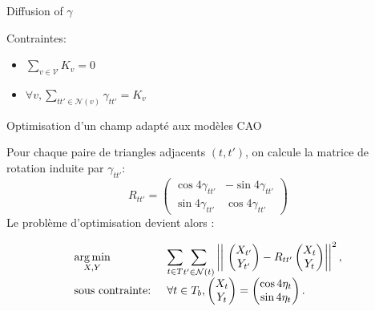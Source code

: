 \begin{frame}{Diffusion of $\gamma$}
\begin{minipage}{0.39\textwidth}
        \vspace{1em}
        \begin{block}{Contraintes:}
            \begin{itemize}
                \item \(\displaystyle\sum_{v \in \mathcal{V}} K_v =0\) 
                \item $ \forall v,\displaystyle\sum_{tt' \in \mathcal{N}(v)}\gamma_{tt'} = K_v$
            \end{itemize}
        \end{block}
    \end{minipage}
    
\end{frame}

\begin{frame}{Optimisation d'un champ adapté aux modèles CAO}

    Pour chaque paire de triangles adjacents $(t, t')$, on calcule la matrice de rotation 
    induite par $\gamma_{tt'}$:
    $$R_{tt'} = \begin{pmatrix}\cos4\gamma_{tt'} & -\sin4\gamma_{tt'} \\ \sin4\gamma_{tt'} & \cos4\gamma_{tt'} \end{pmatrix}$$
    Le problème d'optimisation devient alors :
   
    \begin{equation*}
        \begin{array}{ll}
        \underset{X, Y}{\operatorname*{arg\,min}} & \underset{t \in T}{\displaystyle\sum} \underset{t' \in \mathcal{N}(t)}{\displaystyle\sum} \left|\left|\ \begin{pmatrix} X_{t'}\\ Y_{t'}\end{pmatrix} - R_{tt'} \begin{pmatrix} X_{t}\\ Y_{t}\end{pmatrix} \right|\right|^2, \\
        \text{sous contrainte: } & \forall t \in T_b, \begin{pmatrix} X_{t}\\ Y_{t}\end{pmatrix} = \begin{pmatrix} \cos4\eta_t\\ \sin4\eta_t\end{pmatrix}.
        \end{array}
        \label{eq:cadff_ff_2D_surface_optim}
    \end{equation*}
    
\end{frame}